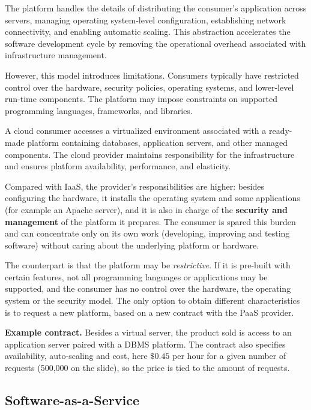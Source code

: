 The platform handles the details of distributing the consumer's application across servers, managing operating system-level configuration, establishing network connectivity, and enabling automatic scaling. This abstraction accelerates the software development cycle by removing the operational overhead associated with infrastructure management.

However, this model introduces limitations. Consumers typically have restricted control over the hardware, security policies, operating systems, and lower-level run-time components. The platform may impose constraints on supported programming languages, frameworks, and libraries.

A cloud consumer accesses a virtualized environment associated with a ready-made platform containing databases, application servers, and other managed components. The cloud provider maintains responsibility for the infrastructure and ensures platform availability, performance, and elasticity.

Compared with IaaS, the provider's responsibilities are higher: besides configuring the hardware, it installs the operating system and some applications (for example an Apache server), and it is also in charge of the \textbf{security and management} of the platform it prepares. The consumer is spared this burden and can concentrate only on its own work (developing, improving and testing software) without caring about the underlying platform or hardware.

The counterpart is that the platform may be \emph{restrictive}. If it is pre-built with certain features, not all programming languages or applications may be supported, and the consumer has no control over the hardware, the operating system or the security model. The only option to obtain different characteristics is to request a new platform, based on a new contract with the PaaS provider.

\textbf{Example contract.} Besides a virtual server, the product sold is access to an application server paired with a DBMS platform. The contract also specifies availability, auto-scaling and cost, here $\$0.45$ per hour for a given number of requests (500{,}000 on the slide), so the price is tied to the amount of requests.

\begin{center}
\end{center}

\subsection{Software-as-a-Service}

